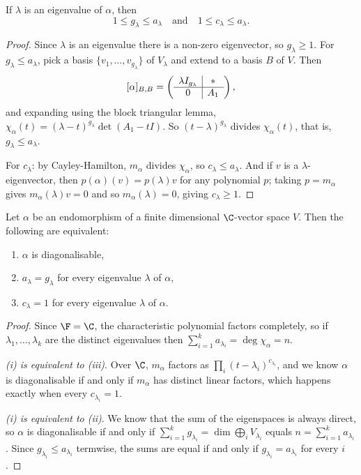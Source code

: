\begin{lemma}
    If $\lambda$ is an eigenvalue of $\alpha$, then
    $$
    1 \leq g_\lambda \leq a_\lambda \quad \text{and} \quad 1 \leq c_\lambda \leq a_\lambda.
    $$
\end{lemma}
\begin{proof}
    Since $\lambda$ is an eigenvalue there is a non-zero eigenvector, so $g_\lambda \geq 1$. For $g_\lambda \leq a_\lambda$, pick a basis $\{v_1, \dots, v_{g_\lambda}\}$ of $V_\lambda$ and extend to a basis $B$ of $V$. Then
    $$
    [\alpha]_{B, B} = \left(\begin{array}{ c | c }
        \lambda I_{g_\lambda} & * \\
        \hline
        0 & A_1
      \end{array}\right),
    $$
    and expanding using the block triangular lemma, $\chi_\alpha(t) = (\lambda - t)^{g_\lambda}\det(A_1 - tI)$. So $(t - \lambda)^{g_\lambda}$ divides $\chi_\alpha(t)$, that is, $g_\lambda \leq a_\lambda$.

    For $c_\lambda$: by Cayley-Hamilton, $m_\alpha$ divides $\chi_\alpha$, so $c_\lambda \leq a_\lambda$. And if $v$ is a $\lambda$-eigenvector, then $p(\alpha)(v) = p(\lambda)v$ for any polynomial $p$; taking $p = m_\alpha$ gives $m_\alpha(\lambda) v = 0$ and so $m_\alpha(\lambda) = 0$, giving $c_\lambda \geq 1$.
\end{proof}

\begin{theorem}
    Let $\alpha$ be an endomorphism of a finite dimensional $\C$-vector space $V$. Then the following are equivalent:
    \begin{enumerate}[label=(\roman*)]
        \item $\alpha$ is diagonalisable,
        \item $a_\lambda = g_\lambda$ for every eigenvalue $\lambda$ of $\alpha$,
        \item $c_\lambda = 1$ for every eigenvalue $\lambda$ of $\alpha$.
    \end{enumerate}
\end{theorem}
\begin{proof}
    Since $\F = \C$, the characteristic polynomial factors completely, so if $\lambda_1, \dots, \lambda_k$ are the distinct eigenvalues then $\sum_{i = 1}^k a_{\lambda_i} = \deg \chi_\alpha = n$.

    \emph{(i) is equivalent to (iii)}. Over $\C$, $m_\alpha$ factors as $\prod_i (t - \lambda_i)^{c_{\lambda_i}}$, and we know $\alpha$ is diagonalisable if and only if $m_\alpha$ has distinct linear factors, which happens exactly when every $c_{\lambda_i} = 1$.

    \emph{(i) is equivalent to (ii)}. We know that the sum of the eigenspaces is always direct, so $\alpha$ is diagonalisable if and only if $\sum_{i = 1}^k g_{\lambda_i} = \dim \bigoplus_i V_{\lambda_i}$ equals $n = \sum_{i = 1}^k a_{\lambda_i}$. Since $g_{\lambda_i} \leq a_{\lambda_i}$ termwise, the sums are equal if and only if $g_{\lambda_i} = a_{\lambda_i}$ for every $i$.
\end{proof}


